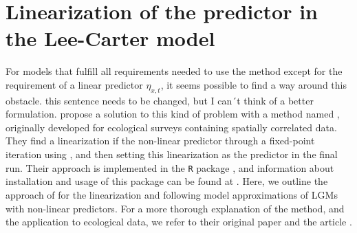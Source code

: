 \newpage
\section{Linearization of the predictor in the Lee-Carter model}
\label{sec:inlabru}
For models that fulfill all requirements needed to use the \inla method except for the requirement of a linear predictor $\eta_{x,t}$, it seems possible to find a way around this obstacle. \textcolor{myDarkGreen}{this sentence needs to be changed, but I can´t think of a better formulation. } \textcite{BachlLindgren2019} propose a solution to this kind of problem with a method named \inlabru, originally developed for ecological surveys containing spatially correlated data. They find a linearization if the non-linear predictor through a fixed-point iteration using \inla, and then setting this linearization as the predictor in the final \inla run. Their approach is implemented in the \texttt{R} package , and information about installation and usage of this package can be found at \cite{Inlabru}. Here, we outline the approach of \textcite{BachlLindgren2019} for the linearization and following model approximations of LGMs with non-linear predictors. For a more thorough explanation of the method, and the application to ecological data, we refer to their original paper \parencite{BachlLindgren2019} and the article \textcite{Inlabru}. 

